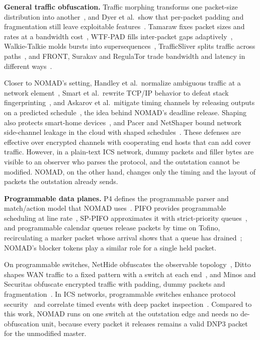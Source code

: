 \textbf{General traffic obfuscation.} Traffic morphing transforms one packet-size distribution into another~\cite{wright2009}, and Dyer et al.\ show that per-packet padding and fragmentation still leave exploitable features~\cite{dyer2012}. Tamaraw fixes packet sizes and rates at a bandwidth cost~\cite{tamaraw2014}, WTF-PAD fills inter-packet gaps adaptively~\cite{juarez2016}, Walkie-Talkie molds bursts into supersequences~\cite{walkietalkie2017}, TrafficSliver splits traffic across paths~\cite{trafficsliver2020}, and FRONT, Surakav and RegulaTor trade bandwidth and latency in different ways~\cite{front2020,surakav2022,regulator2022}.

Closer to NOMAD's setting, Handley et al.\ normalize ambiguous traffic at a network element~\cite{normalization2001}, Smart et al.\ rewrite TCP/IP behavior to defeat stack fingerprinting~\cite{smart2000}, and Askarov et al.\ mitigate timing channels by releasing outputs on a predicted schedule~\cite{askarov2010}, the idea behind NOMAD's deadline release. Shaping also protects smart-home devices~\cite{apthorpe2019}, and Pacer and NetShaper bound network side-channel leakage in the cloud with shaped schedules~\cite{pacer2022,netshaper2024}. These defenses are effective over encrypted channels with cooperating end hosts that can add cover traffic. However, in a plain-text ICS network, dummy packets and filler bytes are visible to an observer who parses the protocol, and the outstation cannot be modified. NOMAD, on the other hand, changes only the timing and the layout of packets the outstation already sends.

\textbf{Programmable data planes.} P4 defines the programmable parser and match/action model that NOMAD uses~\cite{p4ccr2014}. PIFO provides programmable scheduling at line rate~\cite{pifo2016}, SP-PIFO approximates it with strict-priority queues~\cite{sppifo2020}, and programmable calendar queues release packets by time on Tofino, recirculating a marker packet whose arrival shows that a queue has drained~\cite{calendarq2020}; NOMAD's blocker tokens play a similar role for a single held packet.

On programmable switches, NetHide obfuscates the observable topology~\cite{nethide2018}, Ditto shapes WAN traffic to a fixed pattern with a switch at each end~\cite{ditto2022}, and Minos and Securitas obfuscate encrypted traffic with padding, dummy packets and fragmentation~\cite{minos2025,securitas2026}. In ICS networks, programmable switches enhance protocol security~\cite{hulin2023} and correlate timed events with deep packet inspection~\cite{idetect2026}. Compared to this work, NOMAD runs on one switch at the outstation edge and needs no de-obfuscation unit, because every packet it releases remains a valid DNP3 packet for the unmodified master.
